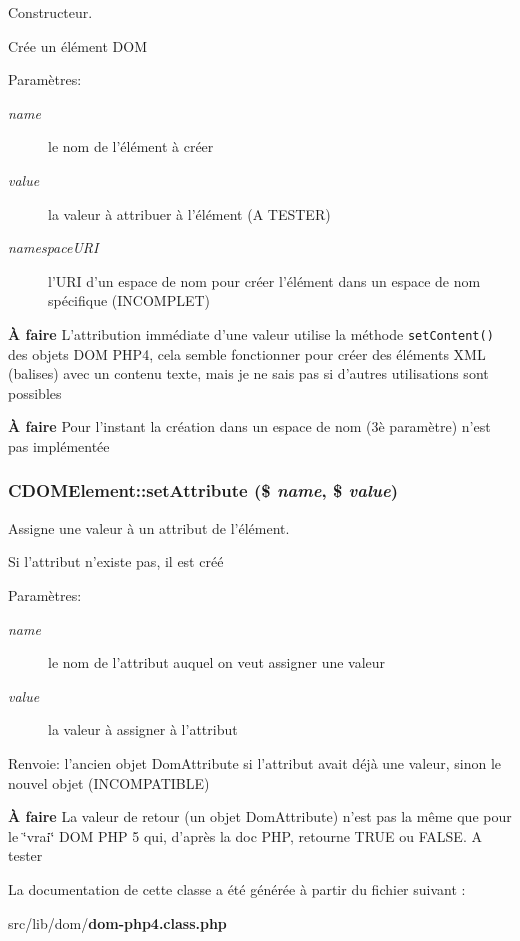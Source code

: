 Constructeur. 

Crée un élément DOM

\begin{Desc}
\item[Paramètres:]
\begin{description}
\item[{\em name}]le nom de l'élément à créer \item[{\em value}]la valeur à attribuer à l'élément (A TESTER) \item[{\em namespaceURI}]l'URI d'un espace de nom pour créer l'élément dans un espace de nom spécifique (INCOMPLET)\end{description}
\end{Desc}
\begin{Desc}
\item[{\bf À faire}]L'attribution immédiate d'une valeur utilise la méthode {\tt setContent()} des objets DOM PHP4, cela semble fonctionner pour créer des éléments XML (balises) avec un contenu texte, mais je ne sais pas si d'autres utilisations sont possibles\end{Desc}
\begin{Desc}
\item[{\bf À faire}]Pour l'instant la création dans un espace de nom (3è paramètre) n'est pas implémentée \end{Desc}
\subsubsection{\setlength{\rightskip}{0pt plus 5cm}CDOMElement::setAttribute (\$ {\em name}, \/  \$ {\em value})}\label{class_c_d_o_m_element_4b57f1fd3690eea06761b009c9c0a1d5}


Assigne une valeur à un attribut de l'élément. 

Si l'attribut n'existe pas, il est créé

\begin{Desc}
\item[Paramètres:]
\begin{description}
\item[{\em name}]le nom de l'attribut auquel on veut assigner une valeur \item[{\em value}]la valeur à assigner à l'attribut\end{description}
\end{Desc}
\begin{Desc}
\item[Renvoie:]l'ancien objet DomAttribute si l'attribut avait déjà une valeur, sinon le nouvel objet (INCOMPATIBLE)\end{Desc}
\begin{Desc}
\item[{\bf À faire}]La valeur de retour (un objet DomAttribute) n'est pas la même que pour le \char`\"{}vrai\char`\"{} DOM PHP 5 qui, d'après la doc PHP, retourne TRUE ou FALSE. A tester \end{Desc}


La documentation de cette classe a été générée à partir du fichier suivant :\begin{CompactItemize}
\item 
src/lib/dom/{\bf dom-php4.class.php}\end{CompactItemize}
